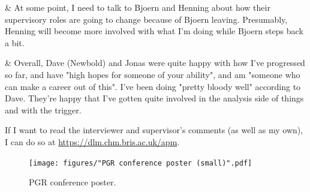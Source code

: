 \begin{easylist}[itemize]
& At some point, I need to talk to Bjoern and Henning about how their supervisory roles are going to change because of Bjoern leaving. Presumably, Henning will become more involved with what I'm doing while Bjoern steps back a bit.

& Overall, Dave (Newbold) and Jonas were quite happy with how I've progressed so far, and have "high hopes for someone of your ability", and am "someone who can make a career out of this". I've been doing "pretty bloody well" according to Dave. They're happy that I've gotten quite involved in the analysis side of things and with the trigger.

\end{easylist}

If I want to read the interviewer and supervisor's comments (as well as my own), I can do so at \url{https://dlm.chm.bris.ac.uk/apm}.

\clearpage
\begin{figure}[htbp]
    \centering
    \texttt{[image: figures/"PGR conference poster (small)".pdf]}
    \caption{PGR conference poster.}
\end{figure}
